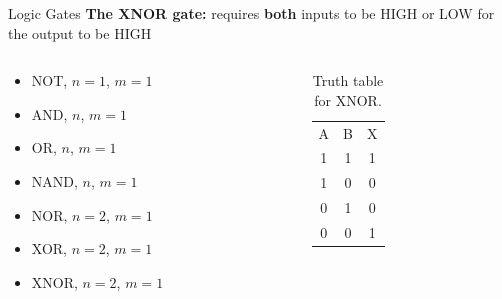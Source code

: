 \documentclass{beamer}
\begin{document}
\begin{frame}{Logic Gates}
\textbf{The XNOR gate:} requires \textbf{both} inputs to be HIGH or LOW for the output to be HIGH \\ \vspace{0.5cm}
\begin{columns}[T]
\begin{column}{0.5\textwidth}
\begin{itemize}
\item \alert{NOT, $n=1$, $m=1$}
\item \alert{AND, $n$, $m=1$}
\item \alert{OR, $n$, $m=1$}
\item \alert{NAND, $n$, $m=1$}
\item \alert{NOR, $n=2$, $m=1$}
\item \alert{XOR, $n=2$, $m=1$}
\item \alert{XNOR, $n=2$, $m=1$}
\end{itemize}
\end{column}
\begin{column}{0.5\textwidth}
\begin{table}
\begin{tabular}{c c c}
A & B & X \\
1 & 1 & 1 \\
1 & 0 & 0 \\
0 & 1 & 0 \\
0 & 0 & 1
\end{tabular}
\caption{\label{tab:XNOR} Truth table for XNOR.}
\end{table}
\end{column}
\end{columns}
\end{frame}
\end{document}
